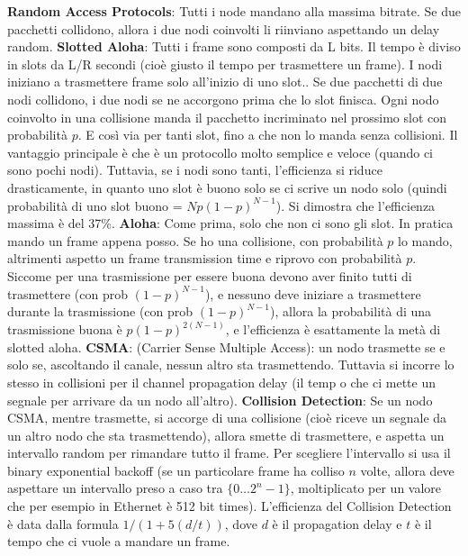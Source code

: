 \documentclass[a4paper,10pt]{article} %
\renewcommand{\b}[1]{%
    {\textbf{#1}}}
\begin{document}
\b{Random Access Protocols}: Tutti i node mandano alla massima bitrate. Se due pacchetti collidono, allora i due nodi coinvolti li riinviano aspettando un delay random.
\b{Slotted Aloha}: Tutti i frame sono composti da L bits. Il tempo è diviso in slots da L/R secondi (cioè giusto il tempo per trasmettere un frame). I nodi iniziano a trasmettere frame solo all'inizio di uno slot.. Se due pacchetti di due nodi collidono, i due nodi se ne accorgono prima che lo slot finisca. Ogni nodo coinvolto in una collisione manda il pacchetto incriminato nel prossimo slot con probabilità $p$. E così via per tanti slot, fino a che non lo manda senza collisioni. Il vantaggio principale è che è un protocollo molto semplice e veloce (quando ci sono pochi nodi). Tuttavia, se i nodi sono tanti, l'efficienza si riduce drasticamente, in quanto uno slot è buono solo se ci scrive un nodo solo (quindi probabilità di uno slot buono = $Np(1-p)^{N-1}$). Si dimostra che l'efficienza massima è del 37\%.
\b{Aloha}: Come prima, solo che non ci sono gli slot. In pratica mando un frame appena posso. Se ho una collisione, con probabilità $p$ lo mando, altrimenti aspetto un frame transmission time e riprovo con probabilità $p$. Siccome per una trasmissione per essere buona devono aver finito tutti di trasmettere (con prob $(1-p)^{N-1}$), e nessuno deve iniziare a trasmettere durante la trasmissione (con prob $(1-p)^{N-1}$), allora la probabilità di una trasmissione buona è $p(1-p)^{2(N-1)}$, e l'efficienza è esattamente la metà di slotted aloha.
\b{CSMA}: (Carrier Sense Multiple Access): un nodo trasmette se e solo se, ascoltando il canale, nessun altro sta trasmettendo. Tuttavia si incorre lo stesso in collisioni per il channel propagation delay (il temp o che ci mette un segnale per arrivare da un nodo all'altro). \b{Collision Detection}: Se un nodo CSMA, mentre trasmette, si accorge di una collisione (cioè riceve un segnale da un altro nodo che sta trasmettendo), allora smette di trasmettere, e aspetta un intervallo random per rimandare tutto il frame. Per scegliere l'intervallo si usa il binary exponential backoff (se un particolare frame ha colliso $n$ volte, allora deve aspettare un intervallo preso a caso tra $\{ 0 \ldots 2^n - 1 \}$, moltiplicato per un valore che per esempio in Ethernet è 512 bit times). L'efficienza del Collision Detection è data dalla formula $1 / (1 + 5(d / t))$, dove $d$ è il propagation delay e $t$ è il tempo che ci vuole a mandare un frame.
\end{document}
